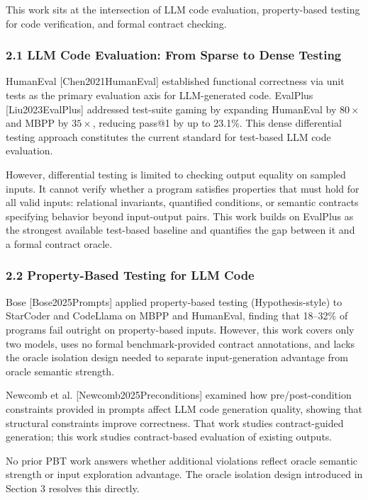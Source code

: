 
This work sits at the intersection of LLM code evaluation, property-based testing for code verification, and formal contract checking.

\subsubsection{2.1 LLM Code Evaluation: From Sparse to Dense Testing}

HumanEval [Chen2021HumanEval] established functional correctness via unit tests as the primary evaluation axis for LLM-generated code. EvalPlus [Liu2023EvalPlus] addressed test-suite gaming by expanding HumanEval by $80\times$ and MBPP by $35\times$, reducing pass@1 by up to 23.1\%. This dense differential testing approach constitutes the current standard for test-based LLM code evaluation.

However, differential testing is limited to checking output equality on sampled inputs. It cannot verify whether a program satisfies properties that must hold for all valid inputs: relational invariants, quantified conditions, or semantic contracts specifying behavior beyond input-output pairs. This work builds on EvalPlus as the strongest available test-based baseline and quantifies the gap between it and a formal contract oracle.

\subsubsection{2.2 Property-Based Testing for LLM Code}

Bose [Bose2025Prompts] applied property-based testing (Hypothesis-style) to StarCoder and CodeLlama on MBPP and HumanEval, finding that 18--32\% of programs fail outright on property-based inputs. However, this work covers only two models, uses no formal benchmark-provided contract annotations, and lacks the oracle isolation design needed to separate input-generation advantage from oracle semantic strength.

Newcomb et al. [Newcomb2025Preconditions] examined how pre/post-condition constraints provided in prompts affect LLM code generation quality, showing that structural constraints improve correctness. That work studies contract-guided generation; this work studies contract-based evaluation of existing outputs.

No prior PBT work answers whether additional violations reflect oracle semantic strength or input exploration advantage. The oracle isolation design introduced in Section 3 resolves this directly.

